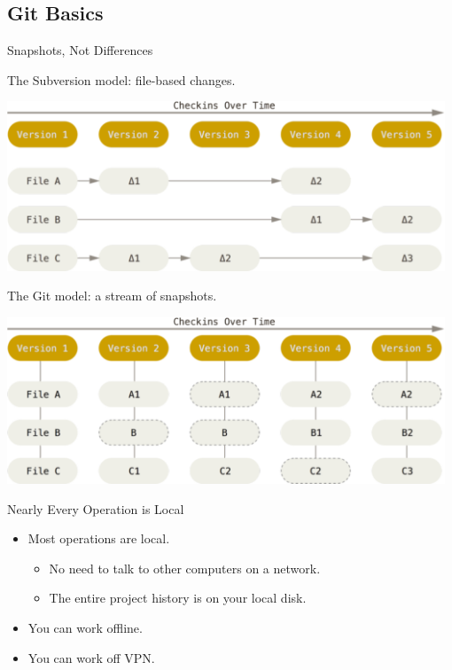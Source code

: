 \subsection{Git Basics}
\begin{frame}[t,allowframebreaks]{Snapshots, Not Differences}

  The Subversion model: file-based changes.

  \begin{center}
    \includegraphics[width=0.98\textwidth]{../images/02-getting-started/deltas}
  \end{center}

  \pagebreak

  The Git model: a stream of snapshots.

  \begin{center}
    \includegraphics[width=0.98\textwidth]{../images/02-getting-started/snapshots}
  \end{center}

\end{frame}

\begin{frame}[t]{Nearly Every Operation is Local}
  \begin{itemize}
    \item Most operations are local.
      \begin{itemize}
        \item No need to talk to other computers on a network.
        \item The entire project history is on your local disk.
      \end{itemize}

    \item You can work offline.
    \item You can work off VPN.  
  \end{itemize}
\end{frame}


